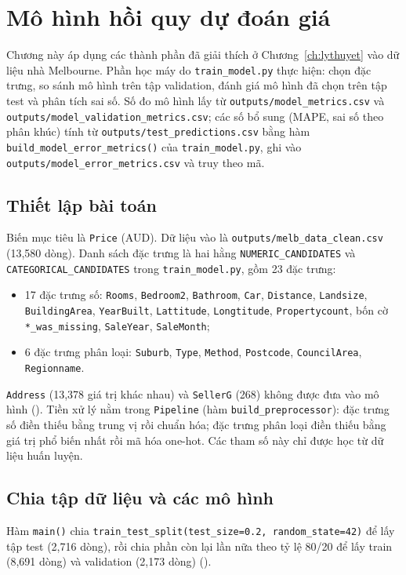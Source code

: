 \chapter{Mô hình hồi quy dự đoán giá}\label{ch:mohinh}

Chương này áp dụng các thành phần đã giải thích ở Chương~\ref{ch:lythuyet} vào dữ liệu nhà Melbourne. Phần học máy do \texttt{train\_model.py} thực hiện: chọn đặc trưng, so sánh mô hình trên tập validation, đánh giá mô hình đã chọn trên tập test và phân tích sai số. Số đo mô hình lấy từ \texttt{outputs/model\_metrics.csv} và \texttt{outputs/model\_validation\_metrics.csv}; các số bổ sung (MAPE, sai số theo phân khúc) tính từ \texttt{outputs/test\_predictions.csv} bằng hàm \texttt{build\_model\_error\_metrics()} của \texttt{train\_model.py}, ghi vào \texttt{outputs/model\_error\_metrics.csv} và truy theo mã.

\section{Thiết lập bài toán}\label{sec:thietlap}
Biến mục tiêu là \texttt{Price} (AUD). Dữ liệu vào là \texttt{outputs/melb\_data\_clean.csv} (13,580 dòng). Danh sách đặc trưng là hai hằng \texttt{NUMERIC\_CANDIDATES} và \texttt{CATEGORICAL\_CANDIDATES} trong \texttt{train\_model.py}, gồm 23 đặc trưng:
\begin{itemize}[nosep]
  \item\raggedright 17 đặc trưng số: \texttt{Rooms}, \texttt{Bedroom2}, \texttt{Bathroom}, \texttt{Car}, \texttt{Distance}, \texttt{Landsize}, \texttt{BuildingArea}, \texttt{YearBuilt}, \texttt{Lattitude}, \texttt{Longtitude}, \texttt{Propertycount}, bốn cờ \texttt{*\_was\_missing}, \texttt{SaleYear}, \texttt{SaleMonth};
  \item 6 đặc trưng phân loại: \texttt{Suburb}, \texttt{Type}, \texttt{Method}, \texttt{Postcode}, \texttt{CouncilArea}, \texttt{Regionname}.
\end{itemize}
\texttt{Address} (13,378 giá trị khác nhau) và \texttt{SellerG} (268) không được đưa vào mô hình (). Tiền xử lý nằm trong \texttt{Pipeline} (hàm \texttt{build\_preprocessor}): đặc trưng số điền thiếu bằng trung vị rồi chuẩn hóa; đặc trưng phân loại điền thiếu bằng giá trị phổ biến nhất rồi mã hóa one-hot. Các tham số này chỉ được học từ dữ liệu huấn luyện.

\section{Chia tập dữ liệu và các mô hình}\label{sec:cacmohinh}
Hàm \texttt{main()} chia \texttt{train\_test\_split(test\_size=0.2, random\_state=42)} để lấy tập test (2,716 dòng), rồi chia phần còn lại lần nữa theo tỷ lệ 80/20 để lấy train (8,691 dòng) và validation (2,173 dòng) ().

